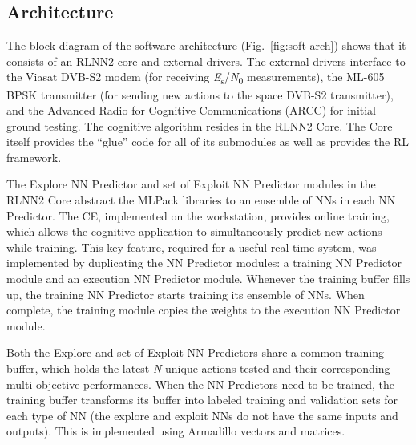 \documentclass[journal]{IEEEtran}
\begin{document}
\subsection{Architecture} \label{sec:architecture-section}
The block diagram of the software architecture (Fig.~\ref{fig:soft-arch}) shows that it consists of an RLNN2 core and external drivers.  The external drivers interface to the Viasat DVB-S2 modem (for receiving \textit{E}\textsubscript{s}/\textit{N}\textsubscript{0} measurements), the ML-605 BPSK transmitter (for sending new actions to the space DVB-S2 transmitter), and the Advanced Radio for Cognitive Communications (ARCC) for initial ground testing.  The cognitive algorithm resides in the RLNN2 Core.  The Core itself provides the ``glue'' code for all of its submodules as well as provides the RL framework.

The Explore NN Predictor and set of Exploit NN Predictor modules in the RLNN2 Core abstract the MLPack libraries to an ensemble of NNs in each NN Predictor.  The CE, implemented on the workstation, provides online training, which allows the cognitive application to simultaneously predict new actions while training.  This key feature, required for a useful real-time system, was implemented by duplicating the NN Predictor modules: a training NN Predictor module and an execution NN Predictor module.  Whenever the training buffer fills up, the training NN Predictor starts training its ensemble of NNs.  When complete, the training module copies the weights to the execution NN Predictor module.

Both the Explore and set of Exploit NN Predictors share a common training buffer, which holds the latest \textit{N} unique actions tested and their corresponding multi-objective performances.  When the NN Predictors need to be trained, the training buffer transforms its buffer into labeled training and validation sets for each type of NN (the explore and exploit NNs do not have the same inputs and outputs).  This is implemented using Armadillo vectors and matrices.
\end{document}
